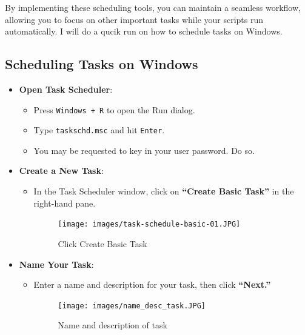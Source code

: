 \documentclass[
  letterpaper,
  DIV=11,
  numbers=noendperiod]{scrreprt}
\begin{document}
By implementing these scheduling tools, you can maintain a seamless
workflow, allowing you to focus on other important tasks while your
scripts run automatically. I will do a qucik run on how to schedule
tasks on Windows.

\subsection{Scheduling Tasks on
Windows}\label{scheduling-tasks-on-windows}

\begin{itemize}
\item
  \textbf{Open Task Scheduler}:

  \begin{itemize}
  \item
    Press \texttt{Windows\ +\ R} to open the Run dialog.
  \item
    Type \texttt{taskschd.msc} and hit \texttt{Enter}.
  \item
    You may be requested to key in your user password. Do so.
  \end{itemize}
\item
  \textbf{Create a New Task}:

  \begin{itemize}
  \item
    In the Task Scheduler window, click on \textbf{``Create Basic
    Task''} in the right-hand pane.

    \begin{figure}[H]

    {\centering \texttt{[image: images/task-schedule-basic-01.JPG]}

    }

    \caption{Click Create Basic Task}

    \end{figure}%
  \end{itemize}
\item
  \textbf{Name Your Task}:

  \begin{itemize}
  \item
    Enter a name and description for your task, then click
    \textbf{``Next.''}

    \begin{figure}[H]

    {\centering \texttt{[image: images/name\_desc\_task.JPG]}

    }

    \caption{Name and description of task}


\end{figure}
\end{itemize}
\end{itemize}
\end{document}
